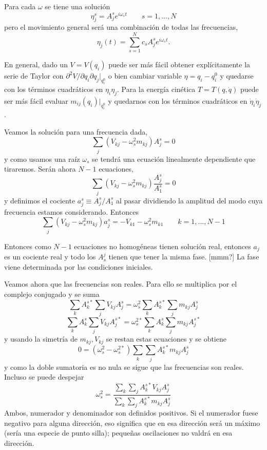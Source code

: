 \documentclass[10pt,oneside]{CBFT_book}
\begin{document}
Para cada $\omega$ se tiene una solución
\[
	\eta_j^s = A_j^s e^{i\omega_s t}	 \qquad s=1,...,N
\]
pero el movimiento general será una combinación de todas las frecuencias,
\[
	\eta_j(t) = \sum_{s=1}^N c_s A_j^s e^{i\omega_s t}.
\]

En general, dado un $V=V(q_i)$ puede ser más fácil obtener explícitamente la serie de Taylor con 
$\partial^2 V/ \partial q_i \partial q_j |_{q_i^0}$ o bien cambiar variable $\eta = q_i - q_i^0$ y quedarse
con los términos cuadráticos en $\eta_i \eta_j$. Para la energía cinética $T=T(q,\dot{q})$ puede ser más
fácil evaluar $m_{ij}(q_i)|_{q_i^0}$ y quedarnos con los términos cuadráticos en $\dot{\eta}_i \dot{\eta}_j$.

Veamos la solución para una frecuencia dada,
\[
	\sum_j ( V_{kj} - \omega_s^2 m_{kj} ) A_j^s = 0
\]
y como usamos una raíz $\omega_s$ se tendrá una ecuación linealmente dependiente que tiraremos. Serán
ahora $N-1$ ecuaciones,
\[
	\sum_j ( V_{kj} - \omega_s^2 m_{kj} ) \frac{A_j^s}{A_1^s} = 0
\]
y definimos el cociente $a_j^s \equiv {A_j^s}/{A_1^s}$ al pasar dividiendo la amplitud del modo cuya frecuencia estamos
considerando. Entonces
\[
	\sum_j ( V_{kj} - \omega_s^2 m_{kj} ) a_j^s = - V_{k1} - \omega_s^2 m_{k1} \qquad k=1,...,N-1
\]

Entonces como $N-1$ ecuaciones no homogéneas tienen solución real, entonces $a_j$ es un cociente real y todo los
$A_s^j$ tienen que tener la misma fase. [mmm?]
La fase viene determinada por las condiciones iniciales.

Veamos ahora que las frecuencias son reales. Para ello se multiplica por el complejo conjugado y se suma
\[
	\sum_k A_k^{s*} \sum_j V_{kj} A_j^s = \omega_s^2 \sum_k A_k^{s*} \sum_j m_{kj} A_j^s
\]
\[
	\sum_k A_k^{s} \sum_j V_{kj} A_j^{s*} = \omega_s^{2*} \sum_k A_k^{s} \sum_j m_{kj} A_j^{s*}
\]
y usando la simetría de $m_{kj}, V_{kj}$ se restan estas ecuaciones y se obtiene
\[
	0 = ( \omega^2_s - \omega^{2*}_s ) \sum_k \sum_j  A_k^{s*} m_{kj} A_j^{s}
\]
y como la doble sumatoria es no nula se sigue que las frecuencias son reales.
Incluso se puede despejar
\[
	\omega_s^2 = \frac{ \sum_k \sum_j  A_k^{s*} V_{kj} A_j^{s} }{ \sum_k \sum_j  A_k^{s*} m_{kj} A_j^{s} }
\]
Ambos, numerador y denominador son definidos positivos.
Si el numerador fuese negativo para alguna dirección, eso significa que en esa dirección será un máximo (sería una
especie de punto silla); pequeñas oscilaciones no valdrá en esa dirección.
\end{document}
